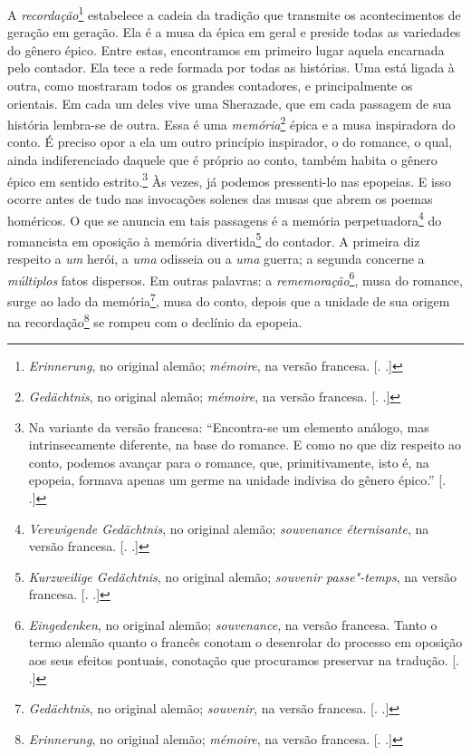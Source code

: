 A \emph{recordação}\footnote{\emph{Erinnerung}, no original alemão;
  \emph{mémoire}, na versão francesa. [. .]} estabelece a
cadeia da tradição que transmite os acontecimentos de geração em
geração. Ela é a musa da épica em geral e preside todas as variedades do
gênero épico. Entre estas, encontramos em primeiro lugar aquela
encarnada pelo contador. Ela tece a rede formada por todas as histórias.
Uma está ligada à outra, como mostraram todos os grandes contadores, e
principalmente os orientais. Em cada um deles vive uma Sherazade, que em
cada passagem de sua história lembra-se de outra. Essa é uma
\emph{memória}\footnote{\emph{Gedächtnis}, no original alemão;
  \emph{mémoire}, na versão francesa. [. .]} épica e a musa
inspiradora do conto. É preciso opor a ela um outro princípio
inspirador, o do romance, o qual, ainda indiferenciado daquele que é
próprio ao conto, também habita o gênero épico em sentido
estrito.\footnote{Na variante da versão francesa: ``Encontra-se um
  elemento análogo, mas intrinsecamente diferente, na base do romance. E
  como no que diz respeito ao conto, podemos avançar para o romance,
  que, primitivamente, isto é, na epopeia, formava apenas um germe na
  unidade indivisa do gênero épico.''
  [. .]} Às vezes, já
podemos pressenti-lo nas epopeias. E isso ocorre antes de tudo nas
invocações solenes das musas que abrem os poemas homéricos. O que se
anuncia em tais passagens é a memória perpetuadora\footnote{\emph{Verewigende
  Gedächtnis}, no original alemão; \emph{souvenance éternisante}, na
  versão francesa. [. .]} do romancista em oposição à memória
divertida\footnote{\emph{Kurzweilige Gedächtnis}, no original alemão;
  \emph{souvenir passe"-temps}, na versão francesa. [. .]} do
contador. A primeira diz respeito a \emph{um} herói, a \emph{uma}
odisseia ou a \emph{uma} guerra; a segunda concerne a \emph{múltiplos}
fatos dispersos. Em outras palavras: a \emph{rememoração}\footnote{\emph{Eingedenken},
  no original alemão; \emph{souvenance}, na versão francesa. Tanto o
  termo alemão quanto o francês conotam o desenrolar do processo em
  oposição aos seus efeitos pontuais, conotação que procuramos preservar
  na tradução. [. .]}, musa do romance, surge ao lado da
memória\footnote{\emph{Gedächtnis}, no original alemão; \emph{souvenir},
  na versão francesa. [. .]}, musa do conto, depois que a
unidade de sua origem na recordação\footnote{\emph{Erinnerung}, no
  original alemão; \emph{mémoire}, na versão francesa. [. .]}
se rompeu com o declínio da epopeia.

